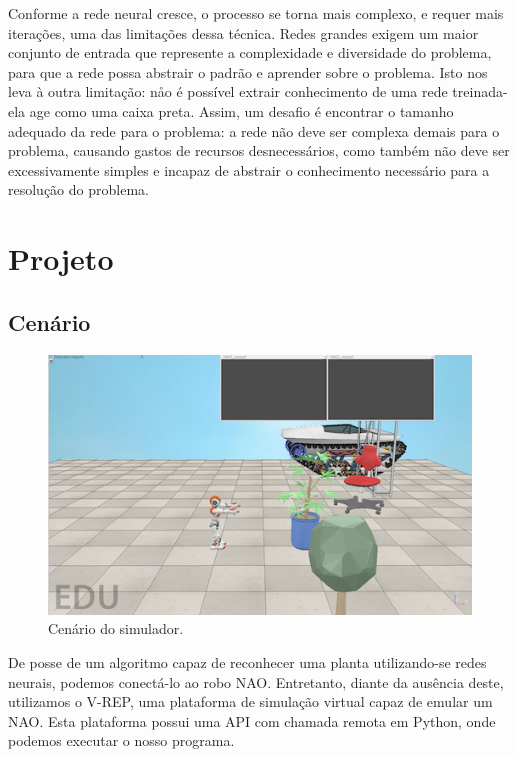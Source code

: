 \documentclass[twoside,conference,a4paper]{IEEEtran}
\begin{document}
Conforme a rede neural cresce, o processo se torna mais complexo, e requer mais iterações, uma das limitações dessa técnica. Redes grandes exigem um maior conjunto de entrada que represente a complexidade e diversidade do problema, para que a rede possa abstrair o padrão e aprender sobre o problema. Isto nos leva à outra limitação: nåo é possível extrair conhecimento de uma rede treinada-ela age como uma caixa preta. Assim, um desafio é encontrar o tamanho adequado da rede para o problema: a rede não deve ser complexa demais para o problema, causando gastos de recursos desnecessários, como também não deve ser excessivamente simples e incapaz de abstrair o conhecimento necessário para a resolução do problema. \cite{Colombini:2016} \cite{Carvalho:2016} \cite{Shiffman:2012}

\section{Projeto}
\subsection{Cenário}
\begin{figure}[ht]
\centering
\includegraphics[width=1\hsize]{figuras/cenario1.png}
\caption{Cenário do simulador.}
\label{fig:fig1}
\end{figure}

De posse de um algoritmo capaz de reconhecer uma planta utilizando-se redes neurais, podemos conectá-lo ao robo NAO. Entretanto, diante da ausência deste, utilizamos o V-REP, uma plataforma de simulação virtual capaz de emular um NAO. Esta plataforma possui uma API com chamada remota em Python, onde podemos executar o nosso programa. 
\end{document}
